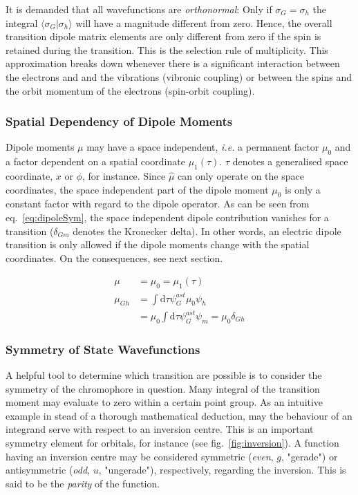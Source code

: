 			It is demanded that all wavefunctions are \emph{orthonormal}: Only if $\sigma_{G} = \sigma_{h}$ the integral $\langle\sigma_{G}|\sigma_{h}\rangle$ will have a magnitude different from zero. Hence, the overall transition dipole matrix elements are only different from zero if the spin is retained during the transition. This is the selection rule of multiplicity. This approximation breaks down whenever there is a significant interaction between the electrons and and the vibrations (vibronic coupling) or between the spins and the orbit momentum of the electrons (spin-orbit coupling). %

			\subsubsection{Spatial Dependency of Dipole Moments}
			Dipole moments $\mu$ may have a space independent, \textit{i.e.} a permanent factor $\mu_0$ and a factor dependent on a spatial coordinate $\mu_1(\tau)$. $\tau$ denotes a generalised space coordinate, $x$ or $\phi$, for instance. Since $\hat{\mu}$ can only operate on the space coordinates, the space independent part of the dipole moment $\mu_0$ is only a constant factor with regard to the dipole operator. As can be seen from eq.~\ref{eq:dipoleSym}, the space independent dipole contribution vanishes for a transition ($\delta_{Gm}$ denotes the Kronecker delta). In other words, an electric dipole transition is only allowed if the dipole moments change with the spatial coordinates. On the consequences, see next section.

			\begin{equation}
			\label{eq:dipoleSym}
			\begin{split}
				\mu &= \mu_0 = \mu_1(\tau) \\
				\mu_{Gh} &= \int \mathrm{d}\tau \psi_G^{ast}\mu_0\psi_h \\
				&= \mu_0\int \mathrm{d}\tau \psi_G^{ast}\psi_m = \mu_0\delta_{Gh}
			\end{split}
			\end{equation}

			\subsubsection{Symmetry of State Wavefunctions}
			\label{sec:sym}
			A helpful tool to determine which transition are possible is to consider the symmetry of the chromophore in question. Many integral of the transition moment may evaluate to zero within a certain point group. As an intuitive example in stead of a thorough mathematical deduction, may the behaviour of an integrand serve with respect to an inversion centre. This is an important symmetry element for orbitals, for instance (see fig.~\ref{fig:inversion}). A function having an inversion centre may be considered symmetric (\emph{even}, $g$, "gerade") or antisymmetric (\emph{odd}, $u$, "ungerade"), respectively, regarding the inversion. This is said to be the \emph{parity} of the function. 

